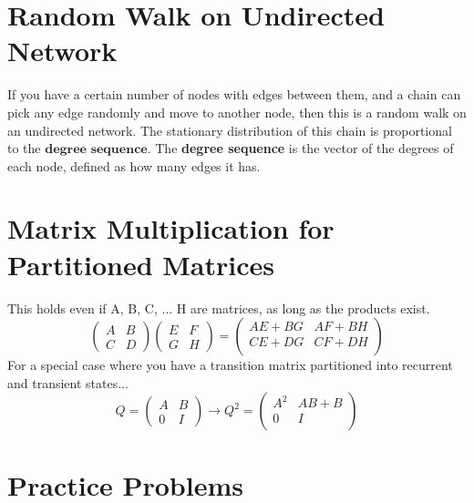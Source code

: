 \documentclass[11pt]{article}
\begin{document}
{\section*{Random Walk on Undirected Network}
If you have a certain number of nodes with edges between them, and a chain can pick any edge randomly and move to another node, then this is a random walk on an undirected network. The stationary distribution of this chain is proportional to the $\textbf{degree sequence}.$ The \textbf{degree sequence} is the vector of the degrees of each node, defined as how many edges it has.


\section*{Matrix Multiplication for Partitioned Matrices}
This holds even if A, B, C, ... H are matrices, as long as the products exist.
\[ \left( \begin{array}{c|c}
A & B \\ \hline
C & D \end{array} \right)
\left( \begin{array}{c|c}
E & F \\ \hline
G & H \end{array} \right)
=
\left( \begin{array}{c|c}
AE + BG & AF + BH \\ \hline
CE + DG & CF + DH \\
 \end{array} \right)
\]
For a special case where you have a transition matrix partitioned into recurrent and transient states...
\[ Q = \left( \begin{array}{c|c}
A & B \\ \hline
0 & I \end{array} \right)
\longrightarrow
Q^2 =
\left( \begin{array}{c|c}
A^2 & AB + B \\ \hline
0 & I \\
 \end{array} \right)
\]

\pagebreak

\section*{Practice Problems}

}
\end{document}
